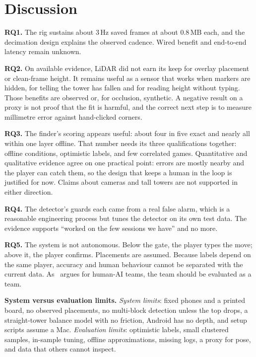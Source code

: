 \documentclass[conference,10pt]{IEEEtran}
\begin{document}
\section{Discussion}\label{sec:discussion}
\textbf{RQ1.} The rig sustains about 3\,Hz saved frames at about 0.8\,MB each, and the decimation design explains the observed cadence. Wired benefit and end-to-end latency remain unknown.

\textbf{RQ2.} On available evidence, LiDAR did not earn its keep for overlay placement or clean-frame height. It remains useful as a sensor that works when markers are hidden, for telling the tower has fallen and for reading height without typing. Those benefits are observed or, for occlusion, synthetic. A negative result on a proxy is not proof that the fit is harmful, and the correct next step is to measure millimetre error against hand-clicked corners.

\textbf{RQ3.} The finder's scoring appears useful: about four in five exact and nearly all within one layer offline. That number needs its three qualifications together: offline conditions, optimistic labels, and few correlated games. Quantitative and qualitative evidence agree on one practical point: errors are mostly nearby and the player can catch them, so the design that keeps a human in the loop is justified for now. Claims about cameras and tall towers are not supported in either direction.

\textbf{RQ4.} The detector's guards each came from a real false alarm, which is a reasonable engineering process but tunes the detector on its own test data. The evidence supports ``worked on the few sessions we have'' and no more.

\textbf{RQ5.} The system is not autonomous. Below the gate, the player types the move; above it, the player confirms. Placements are assumed. Because labels depend on the same player, accuracy and human behaviour cannot be separated with the current data. As~\cite{bondi2022} argues for human-AI teams, the team should be evaluated as a team.

\textbf{System versus evaluation limits.} \emph{System limits}: fixed phones and a printed board, no observed placements, no multi-block detection unless the top drops, a straight-tower balance model with no friction, Android has no depth, and setup scripts assume a Mac. \emph{Evaluation limits}: optimistic labels, small clustered samples, in-sample tuning, offline approximations, missing logs, a proxy for pose, and data that others cannot inspect.
\end{document}
